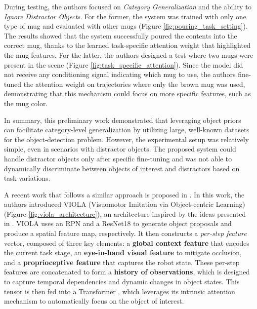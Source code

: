 During testing, the authors focused on \textit{Category Generalization} and the ability to \textit{Ignore Distractor Objects}. For the former, the system was trained with only one type of mug and evaluated with other mugs (Figure \ref{fig:pouring_task_setting}). The results showed that the system successfully poured the contents into the correct mug, thanks to the learned task-specific attention weight that highlighted the mug features. For the latter, the authors designed a test where two mugs were present in the scene (Figure \ref{fig:task_specific_attention}). Since the model did not receive any conditioning signal indicating which mug to use, the authors fine-tuned the attention weight on trajectories where only the brown mug was used, demonstrating that this mechanism could focus on more specific features, such as the mug color.


In summary, this preliminary work demonstrated that leveraging object priors can facilitate category-level generalization by utilizing large, well-known datasets for the object-detection problem. However, the experimental setup was relatively simple, even in scenarios with distractor objects. The proposed system could handle distractor objects only after specific fine-tuning and was not able to dynamically discriminate between objects of interest and distractors based on task variations.

A recent work that follows a similar approach is proposed in \cite{zhu2023viola}. In this work, the authors introduced VIOLA (Visuomotor Imitation via Object-centric Learning) (Figure \ref{fig:viola_architecture}), an architecture inspired by the ideas presented in \cite{devin2018deep}. VIOLA uses an RPN and a ResNet18 \cite{resnet} to generate object proposals and produce a spatial feature map, respectively. It then constructs a \textit{per-step feature} vector, composed of three key elements: a \textbf{global context feature} that encodes the current task stage, an \textbf{eye-in-hand visual feature} to mitigate occlusion, and a \textbf{proprioceptive feature} that captures the robot state. These per-step features are concatenated to form a \textbf{history of observations}, which is designed to capture temporal dependencies and dynamic changes in object states. This tensor is then fed into a Transformer \cite{vaswani2017attention}, which leverages its intrinsic attention mechanism to automatically focus on the object of interest.


